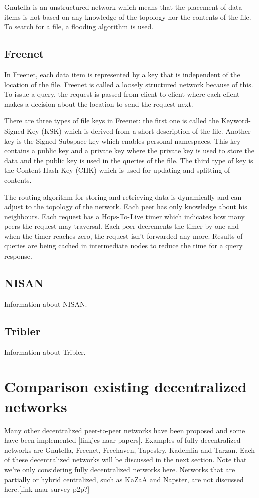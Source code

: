 \documentclass[journal]{IEEEtran}
\begin{document}
			Gnutella is an unstructured network which means that the placement of data items is not based on any knowledge of the topology nor the contents of the file. To search for a file, a flooding algorithm is used.
		
		\subsection{Freenet}
			In Freenet, each data item is represented by a key that is independent of the location of the file. Freenet is called a loosely structured network because of this. To issue a query, the request is passed from client to client where each client makes a decision about the location to send the request next.
		
			There are three types of file keys in Freenet: the first one is called the Keyword-Signed Key (KSK) which is derived from a short description of the file. Another key is the Signed-Subspace key which enables personal namespaces. This key contains a public key and a private key where the private key is used to store the data and the public key is used in the queries of the file. The third type of key is the Content-Hash Key (CHK) which is used for updating and splitting of contents.
		
			The routing algorithm for storing and retrieving data is dynamically and can adjust to the topology of the network. Each peer has only knowledge about his neighbours. Each request has a Hops-To-Live timer which indicates how many peers the request may traversal. Each peer decrements the timer by one and when the timer reaches zero, the request isn't forwarded any more. Results of queries are being cached in intermediate nodes to reduce the time for a query response.
			
		\subsection{NISAN}
			Information about NISAN.
		
		\subsection{Tribler}
			Information about Tribler.



	\section{Comparison existing decentralized  networks}
Many other decentralized peer-to-peer networks have been proposed and some have been implemented [linkjes naar papers]. Examples of fully decentralized networks are Gnutella, Freenet, Freehaven, Tapestry, Kademlia and Tarzan. Each of these decentralized networks will be discussed in the next section. Note that we're only considering fully decentralized networks here. Networks that are partially or hybrid centralized, such as KaZaA and Napster, are not discussed here.[link naar survey p2p?]
\end{document}
